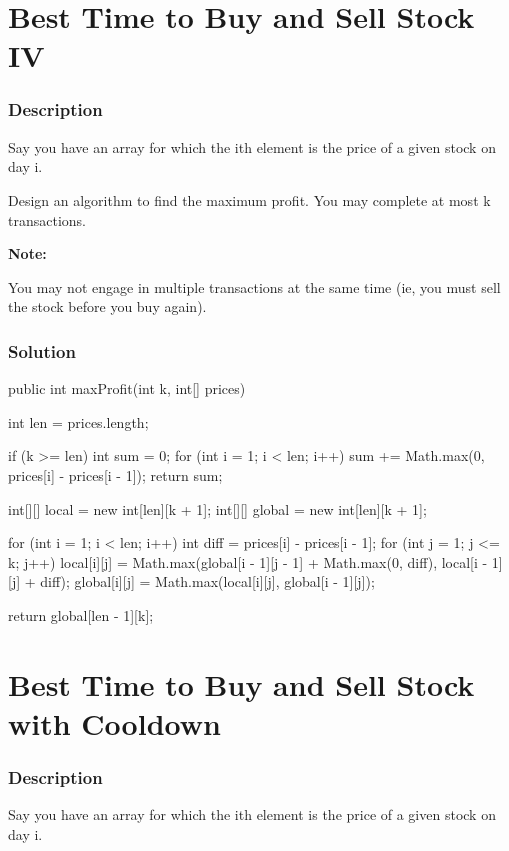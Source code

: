 \newpage

\section{Best Time to Buy and Sell Stock IV} %

\subsubsection{Description}
Say you have an array for which the ith element is the price of a given stock on day i.

Design an algorithm to find the maximum profit. You may complete at most k transactions.

\textbf{Note:}

You may not engage in multiple transactions at the same time (ie, you must sell the stock before you buy again).
\subsubsection{Solution}

\begin{Code}
public int maxProfit(int k, int[] prices) {
    int len = prices.length;

    if (k >= len) {
        int sum = 0;
        for (int i = 1; i < len; i++) {
            sum += Math.max(0, prices[i] - prices[i - 1]);
        }
        return sum;
    }

    int[][] local = new int[len][k + 1];
    int[][] global = new int[len][k + 1];

    for (int i = 1; i < len; i++) {
        int diff = prices[i] - prices[i - 1];
        for (int j = 1; j <= k; j++) {
            local[i][j] = Math.max(global[i - 1][j - 1] + Math.max(0, diff), local[i - 1][j] + diff);
            global[i][j] = Math.max(local[i][j], global[i - 1][j]);
        }
    }

    return global[len - 1][k];
}
\end{Code}

\newpage

\section{Best Time to Buy and Sell Stock with Cooldown} %

\subsubsection{Description}
Say you have an array for which the ith element is the price of a given stock on day i.

